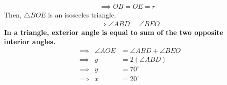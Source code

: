 \documentclass[journal,12pt,twocolumn]{IEEEtran}
\begin{document}
\begin{enumerate}[label= ,ref= ]
 \begin {align} 
\implies OB=OE=r
\end{align} 
Then, $\triangle BOE$ is an isosceles triangle.\\
 \begin{align} 
 \implies \angle ABD=\angle BEO
 \end{align}  
\textbf{In a triangle, exterior angle is equal to sum of the two opposite interior angles.}\\
\begin{align}
&\implies &\angle AOE&=\angle ABD+\angle BEO\\
&\implies &y&=2(\angle ABD)\\
&\implies &y&=70^\circ\\
&\implies &x&=20^\circ
\end{align}  

 
 
                
\end{enumerate}
\end{document}
